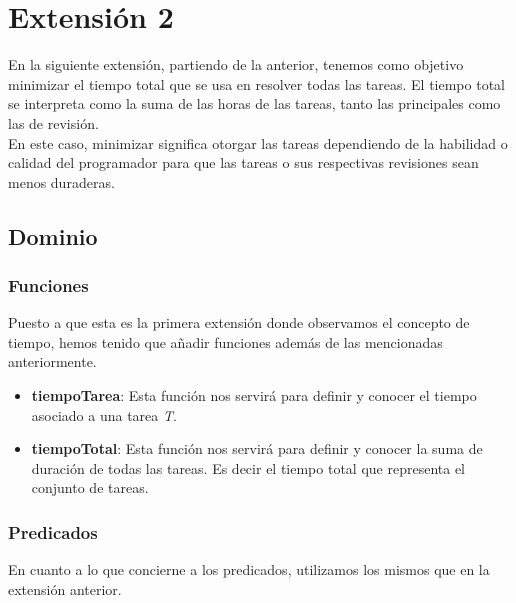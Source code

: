 \documentclass[11pt]{article}
\begin{document}
\newpage

\section{Extensión 2}
En la siguiente extensión, partiendo de la anterior, tenemos como objetivo minimizar el tiempo total que se usa en resolver todas las tareas. El tiempo total se interpreta como la suma de las horas de las tareas, tanto las principales como las de revisión. 
\\
En este caso, minimizar significa otorgar las tareas dependiendo de la habilidad o calidad del programador para que las tareas o sus respectivas revisiones sean menos duraderas. 
\subsection{Dominio}
\subsubsection{Funciones}

Puesto a que esta es la primera extensión donde observamos el concepto de tiempo, hemos tenido que añadir funciones además de las mencionadas anteriormente. 
\begin{itemize}

\item \textbf{tiempoTarea}: Esta función nos servirá para definir y conocer el tiempo asociado a una tarea \textit{T}.
\item \textbf{tiempoTotal}: Esta función nos servirá para definir y conocer la suma de duración de todas las tareas. Es decir el tiempo total que representa el conjunto de tareas. 

\end{itemize}
\subsubsection{Predicados}
En cuanto a lo que concierne a los predicados, utilizamos los mismos que en la extensión anterior.
\end{document}
